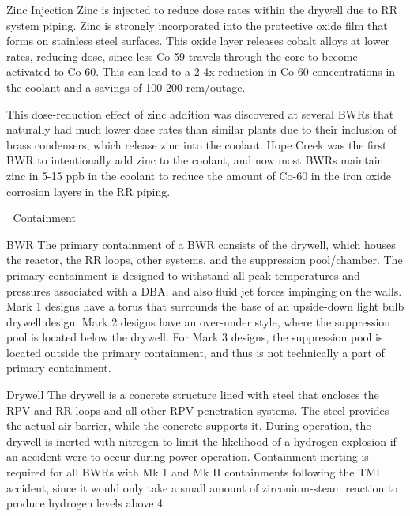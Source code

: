 \documentclass[10pt]{article}
\begin{document}
Zinc Injection
Zinc is injected to reduce dose rates within the drywell due to RR system piping. Zinc is strongly incorporated into the protective oxide film that forms on stainless steel surfaces. This oxide layer releases cobalt alloys at lower rates, reducing dose, since less Co-59 travels through the core to become activated to Co-60. This can lead to a 2-4x reduction in Co-60 concentrations in the coolant and a savings of 100-200 rem/outage.

This dose-reduction effect of zinc addition was discovered at several BWRs that naturally had much lower dose rates than similar plants due to their inclusion of brass condensers, which release zinc into the coolant. Hope Creek was the first BWR to intentionally add zinc to the coolant, and now most BWRs maintain zinc in 5-15 ppb in the coolant to reduce the amount of Co-60 in the iron oxide corrosion layers in the RR piping.  

 

Containment

BWR
The primary containment of a BWR consists of the drywell, which houses the reactor, the RR loops, other systems, and the suppression pool/chamber. The primary containment is designed to withstand all peak temperatures and pressures associated with a DBA, and also fluid jet forces impinging on the walls. Mark 1 designs have a torus that surrounds the base of an upside-down light bulb drywell design. Mark 2 designs have an over-under style, where the suppression pool is located below the drywell.  For Mark 3 designs, the suppression pool is located outside the primary containment, and thus is not technically a part of primary containment. 

Drywell
The drywell is a concrete structure lined with steel that encloses the RPV and RR loops and all other RPV penetration systems. The steel provides the actual air barrier, while the concrete supports it. During operation, the drywell is inerted with nitrogen to limit the likelihood of a hydrogen explosion if an accident were to occur during power operation. Containment inerting is required for all BWRs with Mk 1 and Mk II containments following the TMI accident, since it would only take a small amount of zirconium-steam reaction to produce hydrogen levels above 4%
\end{document}
